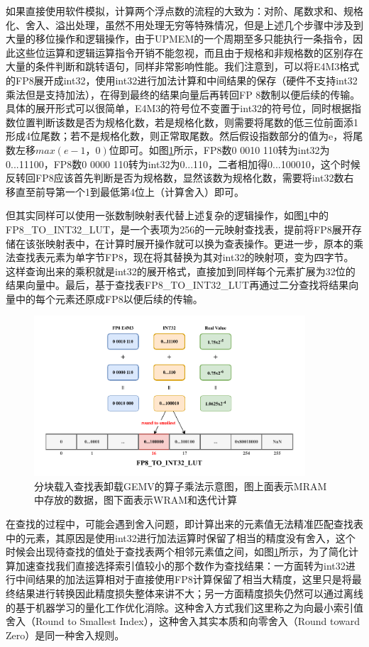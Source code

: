 如果直接使用软件模拟，计算两个浮点数的流程的大致为：对阶、尾数求和、规格化、舍入、溢出处理，虽然不用处理无穷等特殊情况，但是上述几个步骤中涉及到大量的移位操作和逻辑操作，由于UPMEM的一个周期至多只能执行一条指令\cite{UPMEMHotChips}，因此这些位运算和逻辑运算指令开销不能忽视，而且由于规格和非规格数的区别存在大量的条件判断和跳转语句，同样非常影响性能。我们注意到，可以将E4M3格式的FP8展开成int32，使用int32进行加法计算和中间结果的保存（硬件不支持int32乘法但是支持加法），在得到最终的结果向量后再转回FP
8数制以便后续的传输。具体的展开形式可以很简单，E4M3的符号位不变置于int32的符号位，同时根据指数位置判断该数是否为规格化数，若是规格化数，则需要将尾数的低三位前面添1形成4位尾数；若不是规格化数，则正常取尾数。然后假设指数部分的值为e，将尾数左移$max(e-1，0)$位即可。如图\ref{LUTBS}所示，FP8数0 0010 110转为int32为0...11100，FP8数0 0000 110转为int32为0...110，二者相加得0...100010，这个时候反转回FP8应该首先判断是否为规格数，显然该数为规格化数，需要将int32数右移直至前导第一个1到最低第4位上（计算舍入）即可。

但其实同样可以使用一张数制映射表代替上述复杂的逻辑操作，如图\ref{LUTBS}中的FP8\_TO\_INT32\_LUT，是一个表项为256的一元映射查找表，提前将FP8展开存储在该张映射表中，在计算时展开操作就可以换为查表操作。更进一步，原本的乘法查找表元素为单字节FP8，现在将其替换为其对int32的映射项，变为四字节。这样查询出来的乘积就是int32的展开格式，直接加到同样每个元素扩展为32位的结果向量中。最后，基于查找表FP8\_TO\_INT32\_LUT再通过二分查找将结果向量中的每个元素还原成FP8以便后续的传输。

\begin{figure}[!htbp]
	\centering
    \includegraphics[width=0.9\textwidth]{figures/BinarySearch.pdf}
	\caption{分块载入查找表卸载GEMV的算子乘法示意图，图上面表示MRAM中存放的数据，图下面表示WRAM和迭代计算}
    \label{LUTBS}
\end{figure}

在查找的过程中，可能会遇到舍入问题，即计算出来的元素值无法精准匹配查找表中的元素，其原因是使用int32进行加法运算时保留了相当的精度没有舍入，这个时候会出现待查找的值处于查找表两个相邻元素值之间，如图\ref{LUTBS}所示，为了简化计算加速查找我们直接选择索引值较小的那个数作为查找结果：一方面转为int32进行中间结果的加法运算相对于直接使用FP8计算保留了相当大精度，这里只是将最终结果进行转换因此精度损失整体来讲不大；另一方面精度损失仍然可以通过离线的基于机器学习的量化工作优化消除。这种舍入方式我们这里称之为向最小索引值舍入（Round to Smallest Index），这种舍入其实本质和向零舍入（Round toward Zero）是同一种舍入规则。

